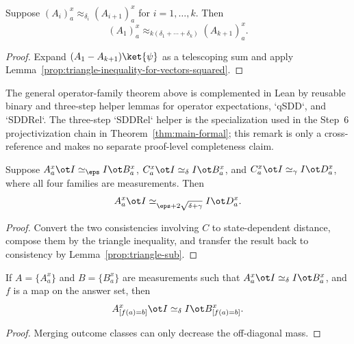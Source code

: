 \begin{lemma}\label{prop:triangle-inequality-for-approx_delta}
	\leanok
	Suppose $(A_i)_a^x \approx_{\delta_i} (A_{i+1})_a^x$ for $i=1,\dots,k$. Then
	\[
		(A_1)_a^x \approx_{k(\delta_1+\cdots+\delta_k)} (A_{k+1})_a^x.
	\]
\end{lemma}
\begin{proof}
	\leanok
	Expand $(A_1-A_{k+1})\ket{\psi}$ as a telescoping sum and apply Lemma~\ref{prop:triangle-inequality-for-vectors-squared}.
\end{proof}

\begin{remark}\label{rem:lean-finite-step-triangle-helpers}
	The general operator-family theorem above is complemented in Lean by reusable
	binary and three-step helper lemmas for operator expectations, `qSDD`, and
	`SDDRel`.  The three-step `SDDRel` helper is the specialization used in the
	Step~6 projectivization chain in Theorem~\ref{thm:main-formal}; this remark is
	only a cross-reference and makes no separate proof-level completeness claim.
\end{remark}

\begin{lemma}\label{prop:simeq-triangle-inequality}
	\leanok
	Suppose $A_a^x \ot I \simeq_\eps I \ot B_a^x$, $C_a^x \ot I \simeq_\delta I \ot B_a^x$, and $C_a^x \ot I \simeq_\gamma I \ot D_a^x$, where all four families are measurements. Then
	\[
		A_a^x \ot I \simeq_{\eps + 2\sqrt{\delta+\gamma}} I \ot D_a^x.
	\]
\end{lemma}
\begin{proof}
	\leanok
	Convert the two consistencies involving $C$ to state-dependent distance, compose them by the triangle inequality, and transfer the result back to consistency by Lemma~\ref{prop:triangle-sub}.
\end{proof}

\begin{lemma}\label{prop:simeq-data-processing}
	\leanok
	If $A=\{A_a^x\}$ and $B=\{B_a^x\}$ are measurements such that $A_a^x \ot I \simeq_\delta I \ot B_a^x$, and $f$ is a map on the answer set, then
	\[
		A_{[f(a)=b]}^x \ot I \simeq_\delta I \ot B_{[f(a)=b]}^x.
	\]
\end{lemma}
\begin{proof}
	\leanok
	Merging outcome classes can only decrease the off-diagonal mass.
\end{proof}

